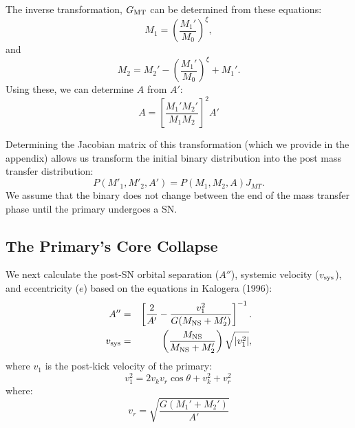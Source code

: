 \documentclass[12pt, preprint]{aastex}
\begin{document}
The inverse transformation, $G_{\rm MT}$ can be determined from these equations:
\begin{equation}
M_1 = \left( \frac{M_1'}{M_0} \right)^{\xi},
\end{equation}
and
\begin{equation}
M_2 = M_2' - \left( \frac{M_1'}{M_0} \right)^{\xi} + M_1'.
\end{equation}
Using these, we can determine $A$ from $A'$:
\begin{equation}
A = \left[ \frac{M_1' M_2'}{M_1 M_2} \right]^2 A'
\end{equation}



Determining the Jacobian matrix of this transformation (which we provide in the appendix) allows us transform the initial binary distribution into the post mass transfer distribution:
\begin{equation}
P(M'_1, M'_2, A') = P(M_1, M_2, A) J_{MT}. \label{eq:P_MT}
\end{equation}
We assume that the binary does not change between the end of the mass transfer phase until the primary undergoes a SN. 




\subsection{The Primary's Core Collapse}

We next calculate the post-SN orbital separation ($A''$), systemic velocity ($v_{\rm sys}$), and eccentricity ($e$) based on the equations in Kalogera (1996):
\begin{eqnarray}
A'' &=& \left[ \frac{2 }{A'}  - \frac{v_1^2}{G(M_{\rm NS} + M_2')} \right]^{-1}. \label{eq:SN_A} \\
v_{\rm sys} &=& \left( \frac{M_{\rm NS}}{M_{\rm NS} + M_2'} \right) \sqrt{ |v_1^2| }, \label{eq:SN_v_sys}
\end{eqnarray}
where $v_1$ is the post-kick velocity of the primary:
\begin{equation}
v_1^2 = 2v_k v_r \cos \theta + v_k^2 + v_r^2\, 
\end{equation}
where:
\begin{equation}
v_r = \sqrt{\frac{G (M_1' + M_2')}{A'}} \label{eq:v_r}
\end{equation}
\end{document}
